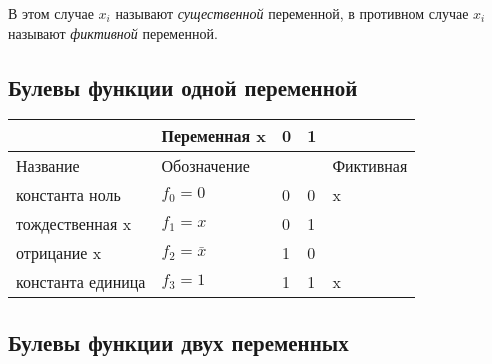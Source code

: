 \documentclass{article}
\begin{document}
	В этом случае $x_i$ называют \textit{существенной} переменной, в противном случае $x_i$
	называют \textit{фиктивной} переменной.

	\begin{center}
		\subsection*{Булевы функции одной переменной}
	\end{center}

	\begin{table}[ht]
		\begin{tabular}{|l|l|l|l|l|}
			\hline
			\rowcolor[HTML]{E2C8E4} 
			& Переменная x    & 0 & 1 &           \\ \hline
			\rowcolor[HTML]{9FC0AF} 
			Название          & Обозначение     &   &   & Фиктивная \\ \hline
			\rowcolor[HTML]{CFB9A9} 
			константа ноль    & $f_0 = 0$       & 0 & 0 & x         \\ \hline
			\rowcolor[HTML]{BCAC8E} 
			тождественная x   & $f_1 = x$       & 0 & 1 &           \\ \hline
			\rowcolor[HTML]{A5D9C8} 
			отрицание x       & $f_2 = \bar{x}$ & 1 & 0 &           \\ \hline
			\rowcolor[HTML]{B8BCE4} 
			константа единица & $f_3 = 1$       & 1 & 1 & x         \\ \hline
		\end{tabular}
	\end{table}

	\begin{center}
	\subsection*{Булевы функции двух переменных}
	\end{center}
\end{document}
